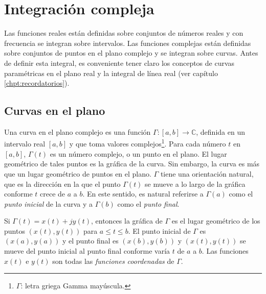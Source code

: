 \chapter{Integración compleja}

Las funciones reales están definidas sobre conjuntos de números reales y con frecuencia se integran sobre intervalos. Las funciones complejas están definidas sobre conjuntos de puntos en el plano complejo y se integran sobre curvas. Antes de definir esta integral, es conveniente tener claro los conceptos de curvas paramétricas en el plano real y la integral de línea real (ver capítulo \ref{chpt:recordatorios}).

\section{Curvas en el plano}

Una curva en el plano complejo es una función $\Gamma :[a,b]\to\mathbb{C}$, definida en un intervalo real $[a,b]$ y que toma valores complejos\footnote{$\Gamma$: letra griega Gamma mayúscula.}. Para cada número $t$ en $[a,b]$, $\Gamma(t)$ es un número complejo, o un punto en el plano. El lugar geométrico de tales puntos es la gráfica de la curva. Sin embargo, la curva es más que un lugar geométrico de puntos en el plano. $\Gamma$ tiene una orientación natural, que es la dirección en la que el punto $\Gamma(t)$ se mueve a lo largo de la gráfica conforme $t$ crece de $a$ a $b$. En este sentido, es natural referirse a $\Gamma(a)$ como el \textit{punto inicial} de la curva y a $\Gamma(b)$ como el \textit{punto final}.

Si $\Gamma(t)=x(t)+jy(t)$, entonces la gráfica de $\Gamma$ es el lugar geométrico de los puntos $(x(t),y(t))$ para $a\leqslant t\leqslant b$. El punto inicial de $\Gamma$ es $(x(a),y(a))$ y el punto final es $(x(b),y(b))$ y $(x(t),y(t))$ se mueve del punto inicial al punto final conforme varía $t$ de $a$ a $b$. Las funciones $x(t)$ e $y(t)$ son todas las \textit{funciones coordenadas} de $\Gamma$.

